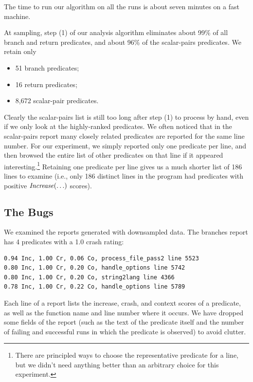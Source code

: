 The time to run our algorithm on all the runs is about seven minutes on
a fast machine.

At  sampling, step (1) of our analysis algorithm eliminates about 99\% of
all branch and return predicates, and about 96\% of the scalar-pairs
predicates.  We retain only
\begin{itemize}
\item 51 branch predicates;

\item 16 return predicates;

\item 8,672 scalar-pair predicates.
\end{itemize}

Clearly the scalar-pairs list is still too long after step (1) to
process by hand, even if we only look at the highly-ranked predicates.
We often noticed that in the scalar-pairs report many closely related
predicates are reported for the same line number.  For our experiment,
we simply reported only one predicate per line, and then browsed the
entire list of other predicates on that line if it appeared
interesting.\footnote{There are principled ways to choose the
representative predicate for a line, but we didn't need anything
better than an arbitrary choice for this experiment.}  Retaining one
predicate per line gives us a much shorter list of 186 lines to
examine (i.e., only 186 distinct lines in the program had predicates
with positive $\mbox{\textit{Increase}}(\ldots)$ scores).

\subsection{The Bugs}

We examined the reports generated with  downsampled data.
The branches report has 4 predicates with a 1.0 crash rating:
\begin{small}
\begin{verbatim}
0.94 Inc, 1.00 Cr, 0.06 Co, process_file_pass2 line 5523
0.80 Inc, 1.00 Cr, 0.20 Co, handle_options line 5742
0.80 Inc, 1.00 Cr, 0.20 Co, string2lang line 4366
0.78 Inc, 1.00 Cr, 0.22 Co, handle_options line 5789
\end{verbatim}
\end{small}

Each line of a report lists the increase, crash, and context scores of
a predicate, as well as the function name and line number where it
occurs.  We have dropped some fields of the report (such as the text
of the predicate itself and the number of failing and successful runs
in which the predicate is observed) to avoid clutter.

